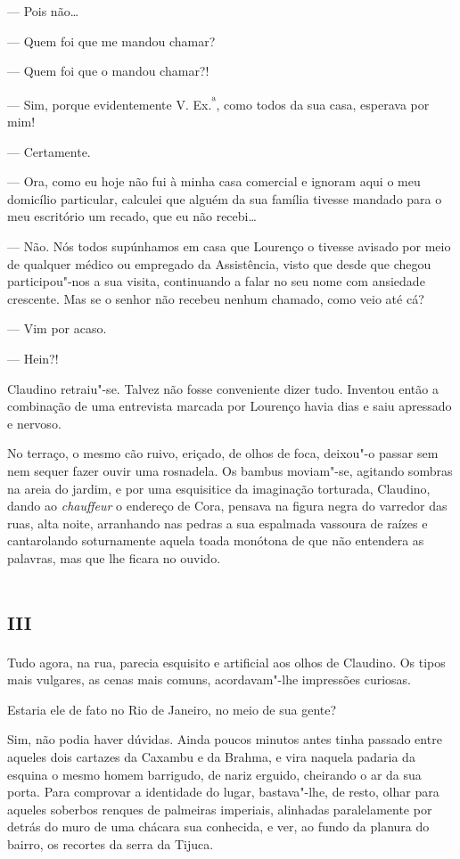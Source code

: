 --- Pois não\ldots{}

--- Quem foi que me mandou chamar?

--- Quem foi que o mandou chamar?!

--- Sim, porque evidentemente V. Ex.\textsuperscript{ª}, como todos da
sua casa, esperava por mim!

--- Certamente.

--- Ora, como eu hoje não fui à minha casa comercial e ignoram aqui o
meu domicílio particular, calculei que alguém da sua família tivesse
mandado para o meu escritório um recado, que eu não recebi\ldots{}

--- Não. Nós todos supúnhamos em casa que Lourenço o tivesse avisado por
meio de qualquer médico ou empregado da Assistência, visto que desde que
chegou participou"-nos a sua visita, continuando a falar no seu nome com
ansiedade crescente. Mas se o senhor não recebeu nenhum chamado, como
veio até cá?

--- Vim por acaso.

--- Hein?!

Claudino retraiu"-se. Talvez não fosse conveniente dizer tudo. Inventou
então a combinação de uma entrevista marcada por Lourenço havia dias e
saiu apressado e nervoso.

No terraço, o mesmo cão ruivo, eriçado, de olhos de foca, deixou"-o
passar sem nem sequer fazer ouvir uma rosnadela. Os bambus moviam"-se,
agitando sombras na areia do jardim, e por uma esquisitice da imaginação
torturada, Claudino, dando ao \emph{chauffeur}
o endereço de Cora, pensava na figura negra do varredor das ruas, alta
noite, arranhando nas pedras a sua espalmada vassoura de raízes e
cantarolando soturnamente aquela toada monótona de que não entendera as
palavras, mas que lhe ficara no ouvido.

\section*{\textsc{iii}}

Tudo agora, na rua, parecia esquisito e artificial aos olhos de
Claudino. Os tipos mais vulgares, as cenas mais comuns, acordavam"-lhe
impressões curiosas.

Estaria ele de fato no Rio de Janeiro, no meio de sua gente?

Sim, não podia haver dúvidas. Ainda poucos minutos antes tinha passado
entre aqueles dois cartazes da Caxambu e da Brahma, e vira naquela
padaria da esquina o mesmo homem barrigudo, de nariz erguido, cheirando
o ar da sua porta. Para comprovar a identidade do lugar, bastava"-lhe, de
resto, olhar para aqueles soberbos renques de palmeiras imperiais,
alinhadas paralelamente por detrás do muro de uma chácara sua conhecida,
e ver, ao fundo da planura do bairro, os recortes da serra da Tijuca.

